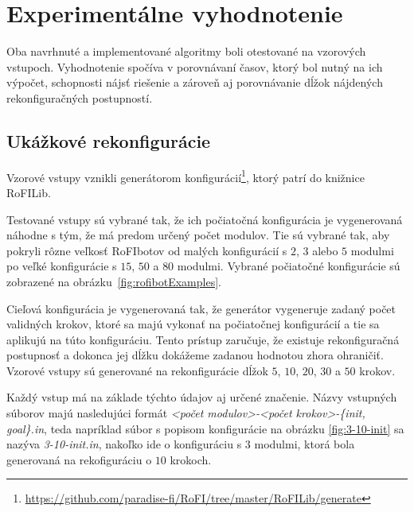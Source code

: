 \documentclass[
  digital, %
  oneside, %
  table,   %
  lof,     %
  nolot,     %
]{fithesis3}
\begin{document}




\chapter{Experimentálne vyhodnotenie}
Oba navrhnuté a implementované algoritmy boli otestované na vzorových vstupoch. Vyhodnotenie spočíva v porovnávaní časov, ktorý bol nutný na ich výpočet, schopnosti nájsť riešenie a zároveň aj porovnávanie dĺžok nájdených rekonfiguračných postupností. 

\section{Ukážkové rekonfigurácie}
Vzorové vstupy vznikli generátorom konfigurácií\footnote{\url{https://github.com/paradise-fi/RoFI/tree/master/RoFILib/generate}}, ktorý patrí do knižnice RoFILib. 

Testované vstupy sú vybrané tak, že ich počiatočná konfigurácia je vygenerovaná náhodne s tým, že má predom určený počet modulov. Tie sú vybrané tak, aby pokryli rôzne veľkosť RoFIbotov od malých konfigurácií s $2$, $3$ alebo $5$ modulmi po veľké konfigurácie s $15$, $50$ a $80$ modulmi. Vybrané počiatočné konfigurácie sú zobrazené na obrázku~\ref{fig:rofibotExamples}. 

Cieľová konfigurácia je vygenerovaná tak, že generátor vygeneruje zadaný počet validných krokov, ktoré sa majú vykonať na počiatočnej konfigurácií a tie sa aplikujú na túto konfiguráciu. Tento prístup zaručuje, že existuje rekonfiguračná postupnosť a dokonca jej dĺžku dokážeme zadanou hodnotou zhora ohraničiť. Vzorové vstupy sú generované na rekonfigurácie dĺžok $5$, $10$, $20$, $30$ a $50$ krokov. 

Každý vstup má na základe týchto údajov aj určené značenie. Názvy vstupných súborov majú nasledujúci formát \textit{<počet modulov>-<počet krokov>-\{init, goal\}.in}, teda napríklad súbor s popisom konfigurácie na obrázku \ref{fig:3-10-init} sa nazýva \textit{3-10-init.in}, nakoľko ide o konfiguráciu s $3$ modulmi, ktorá bola generovaná na rekofiguráciu o $10$ krokoch. 
\end{document}
